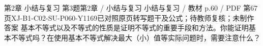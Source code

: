 \par\noindent\begin{minipage}{\linewidth}
\begin{bankitem}{第2章 小结与复习 第3题}{第2章 / 小结与复习 小结与复习 / 教材 p.60 / PDF 第67页}{XJ-B1-C02-SU-P060-Y1169}{已对照原页转写题干及公式；待教师复核；未制作答案}
基本不等式以及不等式的性质是证明不等式的重要手段和方法。你能证明基本不等式吗？在使用基本不等式解决最大（小）值等实际问题时，需要注意什么？
\end{bankitem}
\end{minipage}\par\medskip
